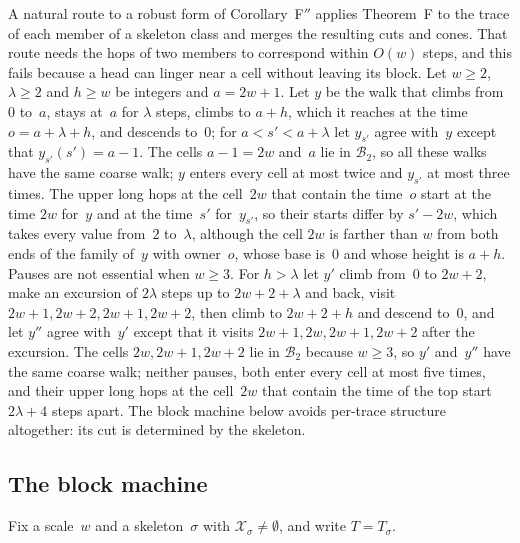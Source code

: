 \begin{remark}\label{rem:naive-skeleton}
A natural route to a robust form of Corollary~F$''$ applies Theorem~F to the trace of each member of a skeleton class
and merges the resulting cuts and cones. That route needs the hops of two members to correspond within $O(w)$ steps, and
this fails because a head can linger near a cell without leaving its block. Let $w\ge2$, $\lambda\ge2$ and $h\ge w$ be
integers and $a=2w+1$. Let $y$ be the walk that climbs from~$0$ to~$a$, stays at~$a$ for $\lambda$ steps, climbs to
$a+h$, which it reaches at the time $o=a+\lambda+h$, and descends to~$0$; for $a<s'<a+\lambda$ let $y_{s'}$ agree
with~$y$ except that $y_{s'}(s')=a-1$. The cells $a-1=2w$ and~$a$ lie in $\mathcal B_2$, so all these walks have the
same coarse walk; $y$ enters every cell at most twice and $y_{s'}$ at most three times. The upper long hops at the
cell~$2w$ that contain the time~$o$ start at the time $2w$ for~$y$ and at the time~$s'$ for~$y_{s'}$, so their starts
differ by $s'-2w$, which takes every value from~$2$ to~$\lambda$, although the cell $2w$ is farther than $w$ from both
ends of the family of~$y$ with owner~$o$, whose base is~$0$ and whose height is $a+h$. Pauses are not essential when
$w\ge3$. For $h>\lambda$ let $y'$ climb from~$0$ to $2w+2$, make an excursion of $2\lambda$ steps up to $2w+2+\lambda$
and back, visit $2w+1,2w+2,2w+1,2w+2$, then climb to $2w+2+h$ and descend to~$0$, and let $y''$ agree with~$y'$ except
that it visits $2w+1,2w,2w+1,2w+2$ after the excursion. The cells $2w,2w+1,2w+2$ lie in $\mathcal B_2$ because $w\ge3$,
so $y'$ and~$y''$ have the same coarse walk; neither pauses, both enter every cell at most five times, and their upper
long hops at the cell~$2w$ that contain the time of the top start $2\lambda+4$ steps apart. The block machine below
avoids per-trace structure altogether: its cut is determined by the skeleton.
\end{remark}

\subsection{The block machine}\label{sec:skel-block}

Fix a scale~$w$ and a skeleton~$\sigma$ with $\mathcal X_\sigma\ne\emptyset$, and write $T=T_\sigma$.


